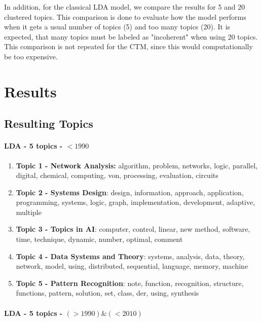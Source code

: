 \documentclass[fleqn,10pt]{SelfArx} %
\begin{document}
In addition, for the classical LDA model, we compare the results for 5 and 20 clustered topics. This comparison is done to evaluate how the model performs when it gets a usual number of topics (5) and too many topics (20). It is expected, that many topics must be labeled as "incoherent" when using 20 topics. This comparison is not repeated for the CTM, since this would computationally be too expensive.

\section{Results}

\subsection{Resulting Topics}

\vspace{0.2cm}

\paragraph{LDA - 5 topics - $< 1990$}

\begin{enumerate}
    \item \textbf{Topic 1 - Network Analysis:} algorithm, problem, networks, logic, parallel, digital, chemical, computing, von, processing, evaluation, circuits
    \item \textbf{Topic 2 - Systems Design}: design, information, approach, application, programming, systems, logic, graph, implementation, development, adaptive, multiple
    \item \textbf{Topic 3 - Topics in AI}: computer, control, linear, new method, software, time, technique, dynamic, number, optimal, comment
    \item \textbf{Topic 4 - Data Systems and Theory}: systems, analysis, data, theory, network, model, using, distributed, sequential, language, memory, machine
    \item \textbf{Topic 5 - Pattern Recognition}: note, function, recognition, structure, functions, pattern, solution, set, class, der, using, synthesis 
\end{enumerate}

\vspace{0.2cm}

\paragraph{LDA - 5 topics - $(> 1990) \& (< 2010)$}
\end{document}
